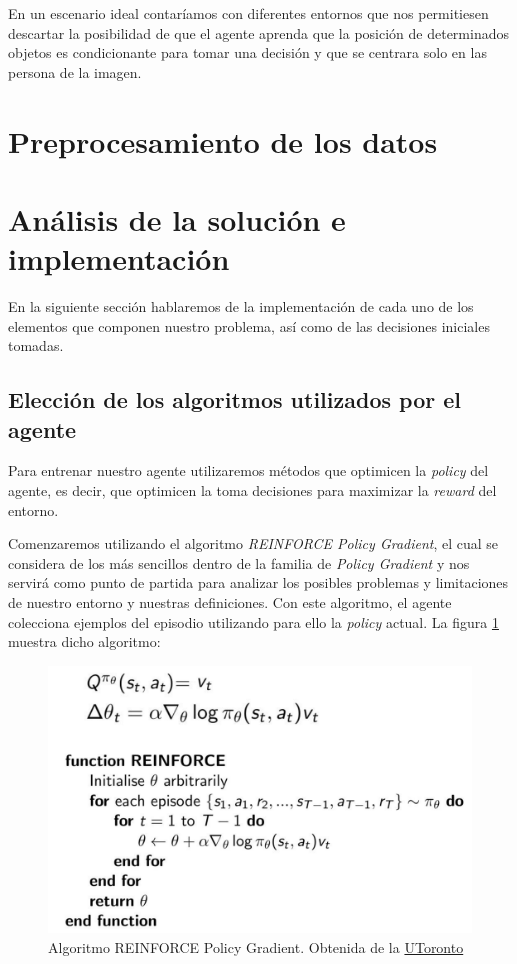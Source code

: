 En un escenario ideal contaríamos con diferentes entornos que nos permitiesen descartar la posibilidad de que el agente aprenda que la posición de determinados objetos es condicionante para tomar una decisión y que se centrara solo en las persona de la imagen.
\medskip

\section{Preprocesamiento de los datos}
\label{preprocesamiento-datos}


\section{Análisis de la solución e implementación}
\label{analisis-de-la-solucion-e-implementacion}

En la siguiente sección hablaremos de la implementación de cada uno de los elementos que componen nuestro problema, así como de las decisiones iniciales tomadas.
\subsection{Elección de los algoritmos utilizados por el agente}
\label{eleccion-de-algoritmos}

Para entrenar nuestro agente utilizaremos métodos que optimicen la \textit{policy} del agente, es decir, que optimicen la toma decisiones para maximizar la \textit{reward} del entorno.
\medskip

Comenzaremos utilizando el algoritmo \textit{REINFORCE Policy Gradient}, el cual se considera de los más sencillos dentro de la familia de \textit{Policy Gradient} y nos servirá como punto de partida para analizar los posibles problemas y limitaciones de nuestro entorno y nuestras definiciones. Con este algoritmo, el agente colecciona ejemplos del episodio utilizando para ello la \textit{policy} actual. La figura \ref{fig-algoritmo-reinforce} muestra dicho algoritmo:
\medskip
\begin{figure}[ht!]
	\centering
	\includegraphics[scale=0.5]{figuras/reinforce_policy_gradient.png}
	\caption[Algoritmo REINFORCE Policy Gradient]{Algoritmo REINFORCE Policy Gradient. Obtenida de la \href{http://www.cs.toronto.edu/~tingwuwang/REINFORCE.pdf}{UToronto}}
	\label{fig-algoritmo-reinforce}
\end{figure}

